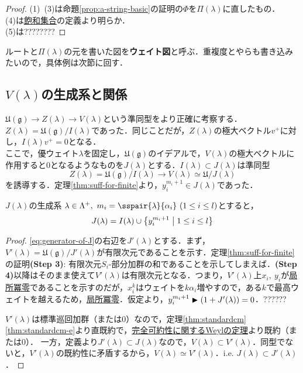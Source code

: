 \documentclass[rep_main]{subfiles}
\begin{document}
\begin{proof}
	(1)~(3)は命題\ref{prop:a-string-basic}の証明の$\Phi$を$\Pi(\lambda)$に直したもの．\\
	(4)は\hyperref[weight-saturated]{飽和集合}の定義より明らか．\\
	(5)は????????
\end{proof}
ルートと$\Pi(\lambda)$の元を書いた図を\textbf{ウェイト図}と呼ぶ．重複度とやらも書き込みたいので，具体例は次節に回す．

\subsection{$V(\lambda)$の生成系と関係}
$\mathfrak{U}(\mathfrak{g}) \to Z(\lambda) \to V(\lambda)$という準同型をより正確に考察する．\\
$Z(\lambda) = \mathfrak{U}(\mathfrak{g}) / I(\lambda)$であった．同じことだが，$Z(\lambda)$の極大ベクトル$v^+$に対し，$I(\lambda) v^+ = 0$となる．\\
ここで，優ウェイト$\lambda$を固定し，$\mathfrak{U}(\mathfrak{g})$のイデアルで，$V(\lambda)$の極大ベクトルに作用すると$0$となるようなものを$J(\lambda)$とする．$I(\lambda) \subset J(\lambda)$は準同型
\begin{equation}
	Z(\lambda) = \mathfrak{U}(\mathfrak{g}) / I(\lambda) \to V(\lambda) \simeq \mathfrak{U} / J(\lambda)
\end{equation}
を誘導する．定理\ref{thm:suff-for-finite}より，$y_i^{m_i + 1} \in J(\lambda)$であった．
\begin{mytheo}[label=thm:generator-of-J]{$J(\lambda)$の生成系}
	$\lambda \in \Lambda^+,\ m_i = \sspair{\lambda}{\alpha_i}\ (1 \leq i \leq l)$とすると，
	\begin{equation}
		\label{eq:generator-of-J}
		J(\lambda) = I(\lambda) \cup \bigl\{y_i^{m_i + 1} \bigm| 1 \leq i \leq l \bigr\}
	\end{equation}
\end{mytheo}
\begin{proof}
	\eqref{eq:generator-of-J}の右辺を$J'(\lambda)$とする．まず，$V'(\lambda) = \mathfrak{U}(\mathfrak{g}) / J'(\lambda)$が有限次元であることを示す．定理\ref{thm:suff-for-finite}の証明\textbf{(Step 3)}: 有限次元$S_i$-部分加群の和であることを示してしまえば．\textbf{(Step 4)}以降はそのまま使えて$V'(\lambda)$は有限次元となる．つまり，$V'(\lambda)$上$x_i,\ y_i$が\hyperref[def:locally-nilpotent]{局所冪零}であることを示すのだが，$x_i^k$はウェイトを$k\alpha_i$増やすので，ある$k$で最高ウェイトを越えるため，\hyperref[def:locally-nilpotent]{局所冪零}．仮定より，$y_i^{m_i + 1} \blacktriangleright (1 + J'(\lambda)) = 0$．??????
	
	$V'(\lambda)$は標準巡回加群（または$0$）なので，定理\ref{thm:standardcm}\ref{thm:standardcm-e}より直既約で，\hyperref[thm:Weyl]{完全可約性に関するWeylの定理}より既約（または$0$）．
	一方，定義より$J'(\lambda) \subset J(\lambda)$なので，$V(\lambda) \subset V'(\lambda)$．同型でないと，$V'(\lambda)$の既約性に矛盾するから，$V(\lambda) \simeq V'(\lambda)$．i.e. $J(\lambda) \subset J'(\lambda)$．
\end{proof}
\end{document}
